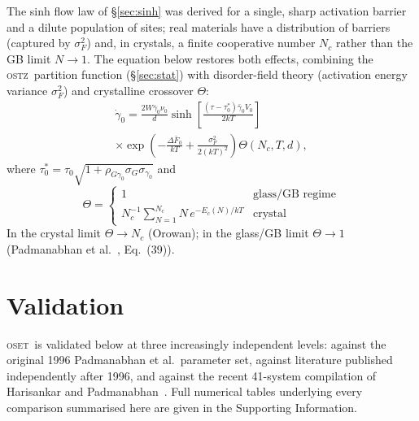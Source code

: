 \documentclass[5p,sort&compress]{elsarticle}
\newcommand{\OSTZ}{\textsc{ostz}}
\newcommand{\OSET}{\textsc{oset}}
\newcommand{\gz}{\gamma_0}
\begin{document}
The sinh flow law of \S\ref{sec:sinh} was derived for a single,
sharp activation barrier and a dilute population of sites; real
materials have a distribution of barriers (captured by $\sigma_F^2$)
and, in crystals, a finite cooperative number $N_c$ rather than the
GB limit $N\to1$. The equation below restores both effects,
combining the \OSTZ\ partition function (\S\ref{sec:stat}) with
disorder-field theory (activation energy variance $\sigma_F^2$)
and crystalline crossover $\Theta$:
\begin{multline}
  \dot\gz=\frac{2W\bar\gz\nu_0}{d}
  \sinh\!\left[\frac{(\tau-\tau_0^*)\bar\gz V_0}{2kT}\right]\\
  \times\exp\!\!\left(-\frac{\Delta\bar F_0}{kT}
  +\frac{\sigma_F^2}{2(kT)^2}\right)\Theta(N_c,T,d),
  \label{eq:rateUnified}
\end{multline}
where $\tau_0^*=\tau_0\sqrt{1+\rho_{G\gz}\sigma_G\sigma_{\gz}}$ and
\begin{equation}
  \Theta=\begin{cases}
    1 & \text{glass/GB regime}\\
    N_c^{-1}\!\sum_{N=1}^{N_c}\!N\,e^{-E_c(N)/kT} & \text{crystal}
  \end{cases}
  \label{eq:Theta}
\end{equation}
In the crystal limit $\Theta\to N_c$ (Orowan); in the glass/GB limit
$\Theta\to1$ (Padmanabhan et al.~\cite{pad-part1}, Eq.~(39)).

\section{Validation}
\label{sec:validation}

\OSET\ is validated below at three increasingly independent levels:
against the original 1996 Padmanabhan et al.\ parameter set, against
literature published independently after 1996, and against the
recent 41-system compilation of Harisankar and
Padmanabhan~\cite{harisankar2025}. Full numerical tables underlying
every comparison summarised here are given in the Supporting
Information.
\end{document}
